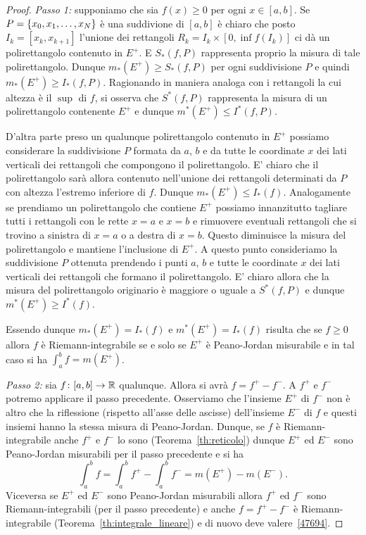 \begin{proof}
\emph{Passo 1:} supponiamo che sia $f(x)\ge 0$ per ogni $x\in [a,b]$.
Se $P={\left\{ x_0,x_1, \dots, x_N \right\}}$ è una suddivione di $[a,b]$ 
è chiaro che posto $I_k = [x_k,x_{k+1}]$ l'unione dei rettangoli 
$R_k = I_k \times [0,\inf f(I_k)]$ ci dà
un polirettangolo contenuto in $E^+$.
E $S_*(f,P)$ rappresenta proprio la misura di tale polirettangolo.
Dunque $m_*(E^+)\ge S_*(f,P)$ per ogni suddivisione $P$ 
e quindi $m_*(E^+)\ge I_*(f,P)$.
Ragionando in maniera analoga con i rettangoli la cui altezza 
è il $\sup$ di $f$, si osserva che $S^*(f,P)$ rappresenta 
la misura di un polirettangolo contenente $E^+$ e dunque 
$m^*(E^+)\le I^*(f,P)$.

D'altra parte preso un qualunque polirettangolo contenuto in $E^+$
possiamo considerare la suddivisione $P$ formata da $a$, $b$ e da tutte le coordinate $x$ 
dei lati verticali dei rettangoli che compongono il polirettangolo. 
E' chiaro che il polirettangolo sarà allora contenuto nell'unione
dei rettangoli determinati da $P$ con altezza l'estremo inferiore di $f$.
Dunque $m_*(E^+)\le I_*(f)$.
Analogamente se prendiamo un polirettangolo che contiene $E^+$ possiamo 
innanzitutto tagliare tutti i rettangoli con le rette $x=a$ e $x=b$
e rimuovere eventuali rettangoli che si trovino a sinistra di $x=a$ 
o a destra di $x=b$. 
Questo diminuisce la misura del polirettangolo e mantiene l'inclusione di $E^+$.
A questo punto consideriamo la suddivisione $P$ ottenuta prendendo i punti 
$a$, $b$ e tutte le coordinate $x$ dei lati verticali dei rettangoli che formano 
il polirettangolo.
E' chiaro allora che la misura del polirettangolo originario è maggiore o uguale 
a $S^*(f,P)$ e dunque $m^*(E^+)\ge I^*(f)$.

Essendo dunque $m_*(E^+)=I_*(f)$ e $m^*(E^+)=I_*(f)$ risulta 
che se $f\ge0$ allora $f$ è Riemann-integrabile se e solo se $E^+$ è Peano-Jordan 
misurabile e in tal caso si ha $\int_a^b f = m(E^+)$.

\emph{Passo 2:} sia $f\colon[a,b]\to {\mathbb R}$ qualunque.
Allora si avrà $f = f^+ - f^-$. 
A $f^+$ e $f^-$ potremo applicare il passo precedente.
Osserviamo che l'insieme $E^+$ di $f^-$ non è altro che la riflessione 
(rispetto all'asse delle ascisse) dell'insieme $E^-$ di $f$
e questi insiemi hanno la stessa misura di Peano-Jordan.
Dunque, se $f$ è Riemann-integrabile anche $f^+$ e $f^-$ 
lo sono (Teorema~\ref{th:reticolo}) 
dunque $E^+$ ed $E^-$ sono Peano-Jordan misurabili per il passo precedente
e si ha 
\begin{equation}
  \label{47694}
\int_a^b f = \int_a^b f^+ - \int_a^b f^- = m(E^+) - m(E^-).  
\end{equation}
Viceversa se $E^+$ ed $E^-$ sono Peano-Jordan misurabili 
allora $f^+$ ed $f^-$ sono Riemann-integrabili (per il passo precedente)
e anche $f=f^+-f^-$ è Riemann-integrabile (Teorema~\ref{th:integrale_lineare})
e di nuovo deve valere~\eqref{47694}.
\end{proof}

